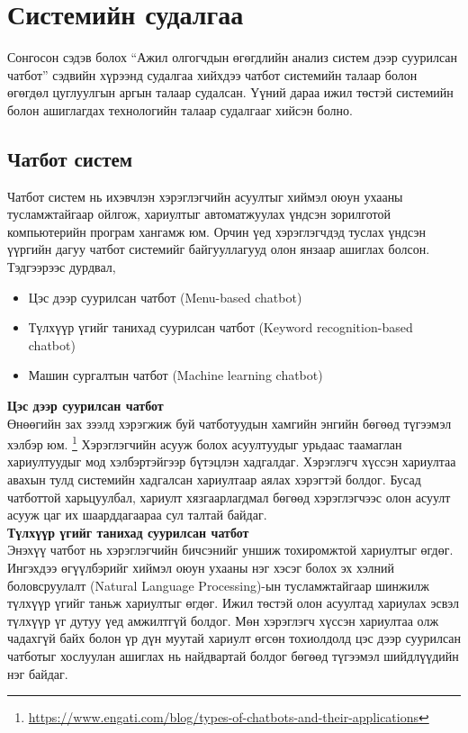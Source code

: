 \section{Системийн судалгаа}
Сонгосон сэдэв болох ``Ажил олгогчдын өгөгдлийн анализ систем дээр суурилсан чатбот'' сэдвийн хүрээнд судалгаа хийхдээ чатбот системийн талаар болон өгөгдөл цуглуулгын аргын талаар судалсан. Үүний дараа ижил төстэй системийн болон ашиглагдах технологийн талаар судалгааг хийсэн болно.
\subsection{Чатбот систем}
Чатбот систем нь ихэвчлэн хэрэглэгчийн асуултыг хиймэл оюун ухааны тусламжтайгаар ойлгож, хариултыг автоматжуулах үндсэн зорилготой компьютерийн програм хангамж юм. Орчин үед хэрэглэгчдэд туслах үндсэн үүргийн дагуу чатбот системийг байгууллагууд олон янзаар ашиглах болсон. Тэдгээрээс дурдвал,
\begin{itemize}
  \item Цэс дээр суурилсан чатбот (Menu-based chatbot)
  \item Түлхүүр үгийг танихад суурилсан чатбот (Keyword recognition-based chatbot)
  \item Машин сургалтын чатбот (Machine learning chatbot)
\end{itemize}
\textbf{Цэс дээр суурилсан чатбот}
\\Өнөөгийн зах зээлд хэрэгжиж буй чатботуудын хамгийн энгийн бөгөөд түгээмэл хэлбэр юм.\cite{chatbotsystem} \footnote{\url{https://www.engati.com/blog/types-of-chatbots-and-their-applications}} Хэрэглэгчийн асууж болох асуултуудыг урьдаас таамаглан хариултуудыг мод хэлбэртэйгээр бүтэцлэн хадгалдаг. Хэрэглэгч хүссэн хариултаа авахын тулд системийн хадгалсан хариултаар аялах хэрэгтэй болдог. Бусад чатботтой харьцуулбал, хариулт хязгаарлагдмал бөгөөд хэрэглэгчээс олон асуулт асууж цаг их шаарддагаараа сул талтай байдаг. 
\\
\textbf{Түлхүүр үгийг танихад суурилсан чатбот}
\\Энэхүү чатбот нь хэрэглэгчийн бичсэнийг уншиж тохиромжтой хариултыг өгдөг. Ингэхдээ өгүүлбэрийг хиймэл оюун ухааны нэг хэсэг болох эх хэлний боловсруулалт (Natural Language Processing)-ын тусламжтайгаар шинжилж түлхүүр үгийг таньж хариултыг өгдөг. Ижил төстэй олон асуултад хариулах эсвэл түлхүүр үг дутуу үед амжилтгүй болдог. Мөн хэрэглэгч хүссэн хариултаа олж чадахгүй байх болон үр дүн муутай хариулт өгсөн тохиолдолд цэс дээр суурилсан чатботыг хослуулан ашиглах нь найдвартай болдог бөгөөд түгээмэл шийдлүүдийн нэг байдаг. 
